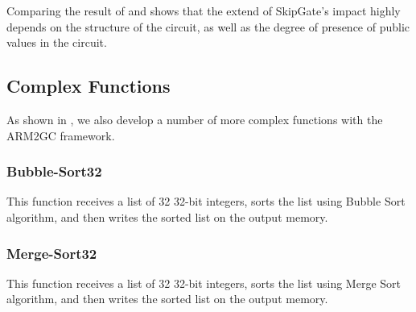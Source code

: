 Comparing the result of  and  shows that the extend of SkipGate's impact highly depends on the structure of the circuit, as well as the degree of presence of public values in the circuit.

\subsection{Complex Functions}
\begin{table}[h]
\centering
\caption{SkipGate algorithm improvement on the ARM sequential circuit for the complex functions.}
\label{tab:complex_funct}
\end{table}

As shown in , we also develop a number of more complex functions with the ARM2GC framework.

\subsubsection{Bubble-Sort32}
This function receives a list of 32 32-bit integers, sorts the list using Bubble Sort algorithm, and then writes the sorted list on the output memory.

\subsubsection{Merge-Sort32}
This function receives a list of 32 32-bit integers, sorts the list using Merge Sort algorithm, and then writes the sorted list on the output memory.

